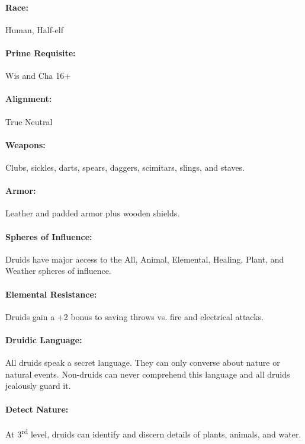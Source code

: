 \begin{multicols}{2}
\paragraph{Race:} Human, Half-elf

\paragraph{Prime Requisite:} Wis and Cha 16+

\paragraph{Alignment:} True Neutral

\paragraph{Weapons:} Clubs, sickles, darts, spears, daggers, scimitars, slings, and staves.

\paragraph{Armor:} Leather and padded armor plus wooden shields.

\paragraph{Spheres of Influence:} Druids have major access to the All, Animal, Elemental, Healing, Plant, and Weather spheres of influence.

\paragraph{Elemental Resistance:} Druids gain a +2 bonus to saving throws vs. fire and electrical attacks.

\paragraph{Druidic Language:} All druids speak a secret language.  They can only converse about nature or natural events.  Non-druids can never comprehend this language and all druids jealously guard it.

\paragraph{Detect Nature:} At 3\textsuperscript{rd} level, druids can identify and discern details of plants, animals, and water.


\end{multicols}
